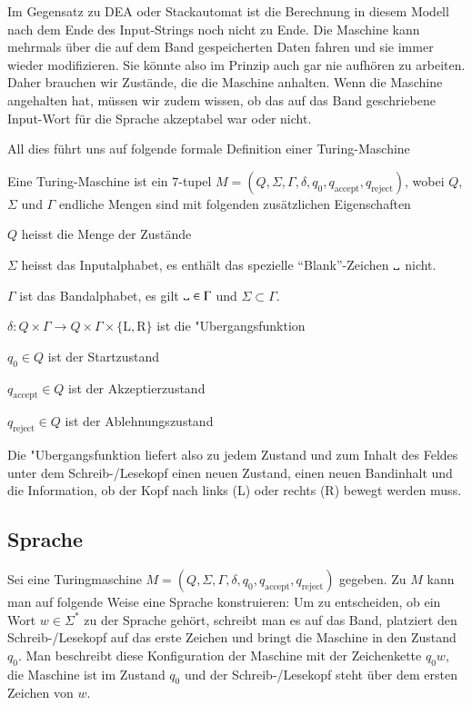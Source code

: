 Im Gegensatz zu DEA oder Stackautomat ist die Berechnung in diesem
Modell nach dem Ende des Input-Strings noch nicht zu Ende. Die Maschine
kann mehrmals über die auf dem Band gespeicherten Daten fahren und
sie immer wieder modifizieren. Sie könnte also im Prinzip auch
gar nie aufhören zu arbeiten. Daher brauchen wir Zustände, die
die Maschine anhalten. Wenn die Maschine angehalten hat, müssen wir
zudem wissen, ob das auf das Band geschriebene Input-Wort für die
Sprache akzeptabel war oder nicht.

All dies führt uns auf folgende formale Definition einer Turing-Maschine
\begin{definition}
Eine Turing-Maschine ist ein $7$-tupel
$M=(Q,\Sigma,\Gamma,\delta,q_0,q_{\text{accept}},q_{\text{reject}})$,
wobei $Q$, $\Sigma$ und $\Gamma$ endliche Mengen sind mit folgenden
zusätzlichen Eigenschaften
\begin{compactenum}
\item $Q$ heisst die Menge der Zustände
\item $\Sigma$ heisst das Inputalphabet, es enthält das spezielle
``Blank''-Zeichen $\blank$ nicht.
\item $\Gamma$ ist das Bandalphabet, es gilt $\blank\in\Gamma$ und
$\Sigma\subset\Gamma$.
\item $\delta\colon Q\times \Gamma\to Q\times\Gamma\times\{\text{L},\text{R}\}$
ist die "Ubergangsfunktion
\item $q_0\in Q$ ist der Startzustand
\item $q_{\text{accept}}\in Q$ ist der Akzeptierzustand
\item $q_{\text{reject}}\in Q$ ist der Ablehnungszustand
\end{compactenum}
\end{definition}
Die "Ubergangsfunktion liefert also zu jedem Zustand und zum
Inhalt des Feldes unter dem Schreib-/Lesekopf einen neuen
Zustand, einen neuen Bandinhalt und die Information, ob
der Kopf nach links (L) oder rechts (R) bewegt werden muss.

\subsection{Sprache}
Sei eine Turingmaschine
$M=(Q,\Sigma,\Gamma,\delta,q_0,q_{\text{accept}},q_{\text{reject}})$
gegeben.
Zu $M$ kann man auf folgende Weise eine Sprache konstruieren:
Um zu entscheiden, ob ein Wort $w\in\Sigma^*$
zu der Sprache gehört,
schreibt man es auf das Band, platziert den Schreib-/Lesekopf auf
das erste Zeichen und bringt die Maschine in den Zustand $q_0$.
Man beschreibt diese Konfiguration der Maschine mit der Zeichenkette
$q_0w$, die Maschine ist im Zustand $q_0$ und der Schreib-/Lesekopf
steht über dem ersten Zeichen von $w$.

